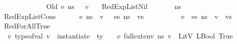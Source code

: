 \begin{isabellebody}
\ \ \ \ \ \ \ \ \ \ \ \ {\isasymLambda}{\isacharcomma}{\kern0pt}{\isasymGamma}{\isacharcomma}{\kern0pt}{\isasymOmega}\ {\isasymturnstile}\ {\isasymlangle}\ Old\ e{\isacharcomma}{\kern0pt}\ n{\isacharunderscore}{\kern0pt}s\ {\isasymrangle}\ {\isasymDown}\ v{\isachardoublequoteclose}\isanewline
\ \ {\isacharbar}{\kern0pt}\ RedExpListNil{\isacharcolon}{\kern0pt}\isanewline
\ \ \ \ {\isachardoublequoteopen}{\isasymLambda}{\isacharcomma}{\kern0pt}{\isasymGamma}{\isacharcomma}{\kern0pt}{\isasymOmega}\ {\isasymturnstile}\ {\isasymlangle}{\isacharbrackleft}{\kern0pt}{\isacharbrackright}{\kern0pt}{\isacharcomma}{\kern0pt}\ n{\isacharunderscore}{\kern0pt}s{\isasymrangle}\ {\isacharbrackleft}{\kern0pt}{\isasymDown}{\isacharbrackright}{\kern0pt}\ {\isacharbrackleft}{\kern0pt}{\isacharbrackright}{\kern0pt}{\isachardoublequoteclose}\isanewline
\ \ {\isacharbar}{\kern0pt}\ RedExpListCons{\isacharcolon}{\kern0pt}\isanewline
\ \ \ \ {\isachardoublequoteopen}{\isasymlbrakk}{\isasymLambda}{\isacharcomma}{\kern0pt}{\isasymGamma}{\isacharcomma}{\kern0pt}{\isasymOmega}\ {\isasymturnstile}\ {\isasymlangle}e{\isacharcomma}{\kern0pt}\ n{\isacharunderscore}{\kern0pt}s{\isasymrangle}\ {\isasymDown}\ v{\isacharsemicolon}{\kern0pt}\ {\isasymLambda}{\isacharcomma}{\kern0pt}{\isasymGamma}{\isacharcomma}{\kern0pt}{\isasymOmega}\ {\isasymturnstile}\ {\isasymlangle}es{\isacharcomma}{\kern0pt}\ n{\isacharunderscore}{\kern0pt}s{\isasymrangle}\ {\isacharbrackleft}{\kern0pt}{\isasymDown}{\isacharbrackright}{\kern0pt}\ vs\ {\isasymrbrakk}\ {\isasymLongrightarrow}\isanewline
\ \ \ \ \ \ {\isasymLambda}{\isacharcomma}{\kern0pt}{\isasymGamma}{\isacharcomma}{\kern0pt}{\isasymOmega}\ {\isasymturnstile}\ {\isasymlangle}{\isacharparenleft}{\kern0pt}e\ {\isacharhash}{\kern0pt}\ es{\isacharparenright}{\kern0pt}{\isacharcomma}{\kern0pt}\ n{\isacharunderscore}{\kern0pt}s{\isasymrangle}\ {\isacharbrackleft}{\kern0pt}{\isasymDown}{\isacharbrackright}{\kern0pt}\ {\isacharparenleft}{\kern0pt}v\ {\isacharhash}{\kern0pt}\ vs{\isacharparenright}{\kern0pt}{\isachardoublequoteclose}\isanewline
\isanewline
\ \ {\isacharbar}{\kern0pt}\ RedForAllTrue{\isacharcolon}{\kern0pt}\isanewline
\ \ \ \ {\isachardoublequoteopen}{\isasymlbrakk}{\isasymAnd}v{\isachardot}{\kern0pt}\ type{\isacharunderscore}{\kern0pt}of{\isacharunderscore}{\kern0pt}val\ v\ {\isacharequal}{\kern0pt}\ {\isacharparenleft}{\kern0pt}instantiate\ {\isasymOmega}\ ty{\isacharparenright}{\kern0pt}\ {\isasymLongrightarrow}\ {\isasymLambda}{\isacharcomma}{\kern0pt}{\isasymGamma}{\isacharcomma}{\kern0pt}{\isasymOmega}\ {\isasymturnstile}\ {\isasymlangle}e{\isacharcomma}{\kern0pt}\ full{\isacharunderscore}{\kern0pt}ext{\isacharunderscore}{\kern0pt}env\ n{\isacharunderscore}{\kern0pt}s\ v{\isasymrangle}\ {\isasymDown}\ LitV\ {\isacharparenleft}{\kern0pt}LBool\ True{\isacharparenright}{\kern0pt}\ {\isasymrbrakk}\ {\isasymLongrightarrow}\ \isanewline

\end{isabellebody}
